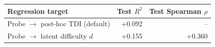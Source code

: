 \begin{tabular}{lrr}
\toprule
Regression target & Test $R^2$ & Test Spearman $\rho$ \\
\midrule
Probe $\to$ post-hoc TDI (default) & +0.092 & -- \\
Probe $\to$ latent difficulty $d$ & +0.155 & +0.360 \\
\bottomrule
\end{tabular}
